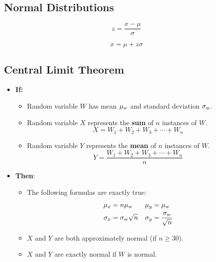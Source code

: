 \documentclass[12pt]{article}
\begin{document}
\renewenvironment{question}{\comment}{\endcomment}
\renewenvironment{solution}{\begin{minipage}{\linewidth} \item }{ \end{minipage} }

\newpage


\small
\begin{enumerate}


\end{enumerate}
\normalsize


\newpage
{}

\subsection*{Normal Distributions}

$$z = \frac{x-\mu}{\sigma}$$

$$x = \mu + z\sigma$$

\subsection*{Central Limit Theorem}
\begin{itemize}
\item {\bf If:}
\begin{itemize}
\item Random variable $W$ has mean $\mu_{\tiny w}$ and standard deviation $\sigma_{\tiny w}$. 
\item Random variable $X$ represents the {\bf sum} of $n$ instances of $W$. 
$$X = W_1+W_2+W_3+\cdots+W_n$$
\item Random variable $Y$ represents the {\bf mean} of $n$ instances of $W$. 
$$Y = \frac{W_1+W_2+W_3+\cdots+W_n}{n}$$
\end{itemize}
\item {\bf Then}:
\begin{itemize}
\item The following formulas are exactly true:
\begin{align*}
\mu_{\tiny x} &= n\mu_{\tiny w} &
\mu_{\tiny y} &= \mu_{\tiny w} \\
\sigma_{\tiny x} &= \sigma_{\tiny w}\sqrt{n} &
\sigma_{\tiny y} &= \frac{\sigma_{\tiny w}}{\sqrt{n}} 
\end{align*}
\item $X$ and $Y$ are both approximately normal (if $n\ge 30$).
\item $X$ and $Y$ are exactly normal if $W$ is normal.
\end{itemize}
\end{itemize}
\end{document}
